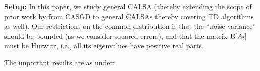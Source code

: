 \textbf{Setup:}  In this paper, we study general CALSA (thereby extending the scope of prior work by \citet{bach} from CASGD to general CALSAs thereby covering TD algorithms as well).  
Our restrictions on the common  distribution is that the ``noise variance'' should be bounded (as we consider squared errors), and that the matrix $\mathbf{E}[A_t]$ must be Hurwitz, i.e., all its eigenvalues have positive real parts. %
\begin{comment}
\begin{table*}
\begin{tabular}{|c|c|c|c|c}\hline
Problem& Universal Step-Size& Uniform Asymptotic Rate& Uniform Finite-Time Rate& Remark \\\hline
\end{tabular}
\end{table*}
\end{comment}
 The important results are as under:
